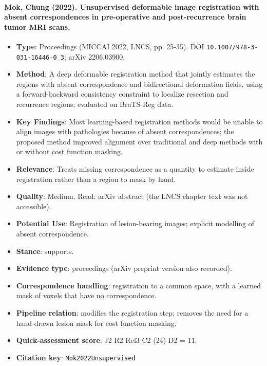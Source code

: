 \documentclass[journal,onecolumn]{IEEEtran}
\begin{document}
\paragraph{Mok, Chung (2022). Unsupervised deformable image registration with absent correspondences in pre-operative and post-recurrence brain tumor MRI scans.~\cite{Mok2022Unsupervised}}\mbox{}

\begin{itemize}

\item{} \textbf{Type}: Proceedings (MICCAI 2022, LNCS, pp. 25-35). DOI \nolinkurl{10.1007/978-3-031-16446-0_3}; arXiv 2206.03900.

\item{} \textbf{Method}: A deep deformable registration method that jointly estimates the regions with absent correspondence and bidirectional deformation fields, using a forward-backward consistency constraint to localize resection and recurrence regions; evaluated on BraTS-Reg data.

\item{} \textbf{Key Findings}: Most learning-based registration methods would be unable to align images with pathologies because of absent correspondences; the proposed method improved alignment over traditional and deep methods with or without cost function masking.

\item{} \textbf{Relevance}: Treats missing correspondence as a quantity to estimate inside registration rather than a region to mask by hand.

\item{} \textbf{Quality}: Medium. Read: arXiv abstract (the LNCS chapter text was not accessible).

\item{} \textbf{Potential Use}: Registration of lesion-bearing images; explicit modelling of absent correspondence.

\item{} \textbf{Stance}: supports.

\item{} \textbf{Evidence type}: proceedings (arXiv preprint version also recorded).

\item{} \textbf{Correspondence handling}: registration to a common space, with a learned mask of voxels that have no correspondence.

\item{} \textbf{Pipeline relation}: modifies the registration step; removes the need for a hand-drawn lesion mask for cost function masking.

\item{} \textbf{Quick-assessment score}: J2 R2 Rel3 C2 (24) D2 = 11.

\item{} \textbf{Citation key}: \texttt{Mok2022Unsupervised}

\end{itemize}
\end{document}
